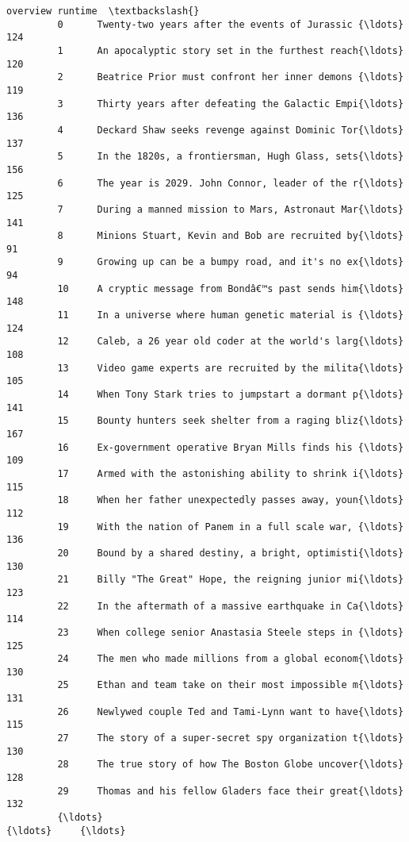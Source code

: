 \documentclass[11pt]{article}
\begin{document}
\begin{Verbatim}[commandchars=\\\{\}]
                                                         overview runtime  \textbackslash{}
         0      Twenty-two years after the events of Jurassic {\ldots}     124   
         1      An apocalyptic story set in the furthest reach{\ldots}     120   
         2      Beatrice Prior must confront her inner demons {\ldots}     119   
         3      Thirty years after defeating the Galactic Empi{\ldots}     136   
         4      Deckard Shaw seeks revenge against Dominic Tor{\ldots}     137   
         5      In the 1820s, a frontiersman, Hugh Glass, sets{\ldots}     156   
         6      The year is 2029. John Connor, leader of the r{\ldots}     125   
         7      During a manned mission to Mars, Astronaut Mar{\ldots}     141   
         8      Minions Stuart, Kevin and Bob are recruited by{\ldots}      91   
         9      Growing up can be a bumpy road, and it's no ex{\ldots}      94   
         10     A cryptic message from Bondâ€™s past sends him{\ldots}     148   
         11     In a universe where human genetic material is {\ldots}     124   
         12     Caleb, a 26 year old coder at the world's larg{\ldots}     108   
         13     Video game experts are recruited by the milita{\ldots}     105   
         14     When Tony Stark tries to jumpstart a dormant p{\ldots}     141   
         15     Bounty hunters seek shelter from a raging bliz{\ldots}     167   
         16     Ex-government operative Bryan Mills finds his {\ldots}     109   
         17     Armed with the astonishing ability to shrink i{\ldots}     115   
         18     When her father unexpectedly passes away, youn{\ldots}     112   
         19     With the nation of Panem in a full scale war, {\ldots}     136   
         20     Bound by a shared destiny, a bright, optimisti{\ldots}     130   
         21     Billy "The Great" Hope, the reigning junior mi{\ldots}     123   
         22     In the aftermath of a massive earthquake in Ca{\ldots}     114   
         23     When college senior Anastasia Steele steps in {\ldots}     125   
         24     The men who made millions from a global econom{\ldots}     130   
         25     Ethan and team take on their most impossible m{\ldots}     131   
         26     Newlywed couple Ted and Tami-Lynn want to have{\ldots}     115   
         27     The story of a super-secret spy organization t{\ldots}     130   
         28     The true story of how The Boston Globe uncover{\ldots}     128   
         29     Thomas and his fellow Gladers face their great{\ldots}     132   
         {\ldots}                                                  {\ldots}     {\ldots}   

\end{Verbatim}
\end{document}
